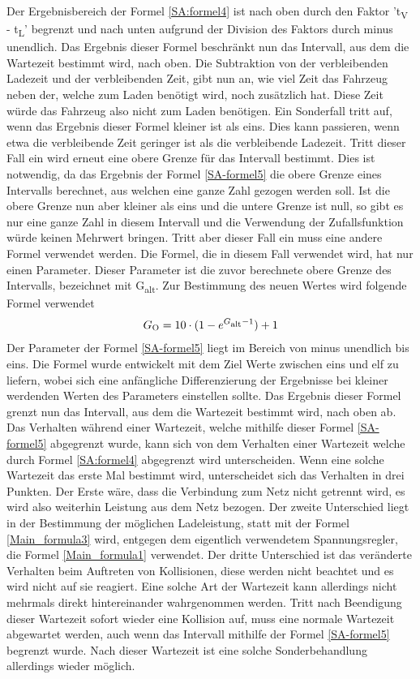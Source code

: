 Der Ergebnisbereich der Formel \ref{SA:formel4} ist nach oben durch den Faktor 't\textsubscript{V} - t\textsubscript{L}' begrenzt und nach unten aufgrund der Division des Faktors durch minus unendlich. Das Ergebnis dieser Formel beschränkt nun das Intervall, aus dem die Wartezeit bestimmt wird, nach oben.  Die Subtraktion von der verbleibenden Ladezeit und der verbleibenden Zeit, gibt nun an, wie viel Zeit das Fahrzeug neben der, welche zum Laden benötigt wird, noch zusätzlich hat. Diese Zeit würde das Fahrzeug also nicht zum Laden benötigen. Ein Sonderfall tritt auf, wenn das Ergebnis dieser Formel kleiner ist als eins. Dies kann passieren, wenn etwa die verbleibende Zeit geringer ist als die verbleibende Ladezeit. Tritt dieser Fall ein wird erneut eine obere Grenze für das Intervall bestimmt. Dies ist notwendig, da das Ergebnis der Formel \ref{SA-formel5} die obere Grenze eines Intervalls berechnet, aus welchen eine ganze Zahl gezogen werden soll. Ist die obere Grenze nun aber kleiner als eins und die untere Grenze ist null, so gibt es nur eine ganze Zahl in diesem Intervall und die Verwendung der Zufallsfunktion würde keinen Mehrwert bringen. Tritt aber dieser Fall ein muss eine andere Formel verwendet werden. Die Formel, die in diesem Fall verwendet wird, hat nur einen Parameter. Dieser Parameter ist die zuvor berechnete obere Grenze des Intervalls, bezeichnet mit G\textsubscript{alt}. Zur Bestimmung des neuen Wertes wird folgende Formel verwendet \\
\begin{align}
	G\textsubscript{O} = 10 \cdot (1 - e^{G\textsubscript{alt} - 1}) + 1
	\label{SA-formel5}
\end{align}
Der Parameter der Formel \ref{SA-formel5} liegt im Bereich von minus unendlich bis eins. Die Formel wurde entwickelt mit dem Ziel Werte zwischen eins und elf zu liefern, wobei sich eine anfängliche Differenzierung der Ergebnisse bei kleiner werdenden Werten des Parameters einstellen sollte. Das Ergebnis dieser Formel grenzt nun das Intervall, aus dem die Wartezeit bestimmt wird, nach oben ab. Das Verhalten während einer Wartezeit, welche mithilfe dieser Formel \ref{SA-formel5} abgegrenzt wurde, kann sich von dem Verhalten einer Wartezeit welche durch Formel \ref{SA:formel4} abgegrenzt wird unterscheiden. Wenn eine solche Wartezeit das erste Mal bestimmt wird, unterscheidet sich das Verhalten in drei Punkten. Der Erste wäre, dass die Verbindung zum Netz nicht getrennt wird, es wird also weiterhin Leistung aus dem Netz bezogen. Der zweite Unterschied liegt in der Bestimmung der möglichen Ladeleistung, statt mit der Formel \ref{Main_formula3} wird, entgegen dem eigentlich verwendetem Spannungsregler, die Formel \ref{Main_formula1} verwendet. Der dritte Unterschied ist das veränderte Verhalten beim Auftreten von Kollisionen, diese werden nicht beachtet und es wird nicht auf sie reagiert. Eine solche Art der Wartezeit kann allerdings nicht mehrmals direkt hintereinander wahrgenommen werden. Tritt nach Beendigung dieser Wartezeit sofort wieder eine Kollision auf, muss eine normale Wartezeit abgewartet werden, auch wenn das Intervall mithilfe der Formel \ref{SA-formel5} begrenzt wurde. Nach dieser Wartezeit ist eine solche Sonderbehandlung allerdings wieder möglich.\\
